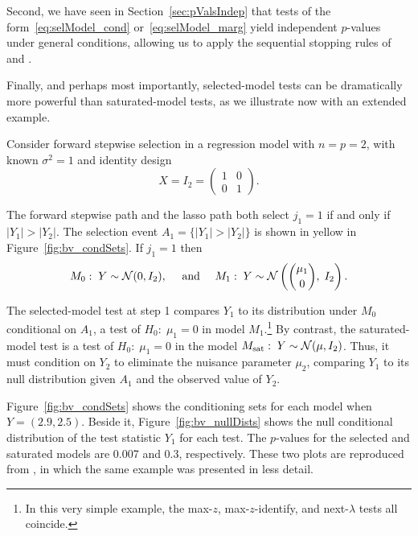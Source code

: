 \documentclass{article}
\begin{document}
Second, we have seen in Section~\ref{sec:pValsIndep} that tests of the form~\eqref{eq:selModel_cond} or~\eqref{eq:selModel_marg} yield independent $p$-values under general conditions, allowing us to apply  the sequential stopping rules of~\citet{gsell2013sequential} and \citet{li2015accumulation}.

Finally, and perhaps most importantly, selected-model tests can be dramatically more powerful than saturated-model tests, as we illustrate now with an extended example.

\begin{example}\label{ex:bivariate}
  Consider forward stepwise selection in a regression model with $n=p=2$, with known $\sigma^2=1$ and identity design 
\[
X = I_2=\begin{pmatrix} 1 & 0 \\ 0 & 1\end{pmatrix}.
\] 

The forward stepwise path and the lasso path both select $j_1=1$ if and only if $|Y_1|>|Y_2|$. The selection event $A_1=\{|Y_1| > |Y_2|\}$ is shown in yellow in Figure~\ref{fig:bv_condSets}. If $j_1=1$ then
\[
M_0:\; Y\sim \mathcal{N}(0,I_2), \quad \text{ and } \quad
M_1:\; Y \sim \mathcal{N}\left(\binom{\mu_1}{0}, \; I_2\right).
\]

The selected-model test at step 1 compares $Y_1$ to its distribution under $M_0$ conditional on $A_1$, a test of $H_0:\;\mu_1=0$ in model $M_1$.\footnote{In this very simple example, the max-$z$, max-$z$-identify, and next-$\lambda$ tests all coincide.} By contrast, the saturated-model test is a test of $H_0:\; \mu_1=0$ in the model $M_{\text{sat}}:\; Y \sim \mathcal{N}(\mu, I_2)$. Thus, it must condition on $Y_2$ to eliminate the nuisance parameter $\mu_2$, comparing $Y_1$ to its null distribution given $A_1$ and the observed value of $Y_2$.

Figure~\ref{fig:bv_condSets} shows the conditioning sets for each model when $Y=(2.9, 2.5)$. Beside it, Figure~\ref{fig:bv_nullDists} shows the null conditional distribution of the test statistic $Y_1$ for each test. The $p$-values for the selected and saturated models are 0.007 and 0.3, respectively. These two plots are reproduced from \citet{fithian2014optimal}, in which the same example was presented in less detail.
\end{example}
\end{document}
